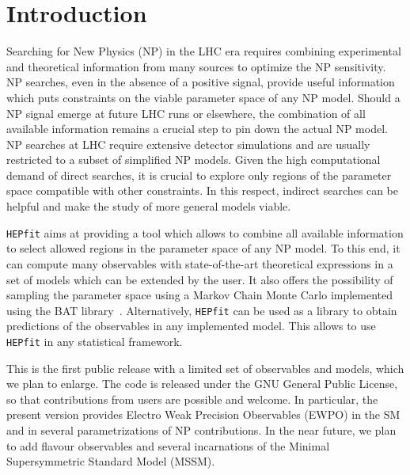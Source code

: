 \documentclass[aps,superscriptaddress,nofootinbib,floatfix,notitlepage]{revtex4-1}
\newcommand{\HEPfit}{\texttt{HEPfit}\xspace}
\begin{document}
\maketitle



\section{Introduction}

Searching for New Physics (NP) in the LHC era requires combining
experimental and theoretical information from many sources to optimize
the NP sensitivity. NP searches, even in the absence of a positive
signal, provide useful information which puts constraints on the
viable parameter space of any NP model. Should a NP signal emerge at
future LHC runs or elsewhere, the combination of all available
information remains a crucial step to pin down the actual NP model.
NP searches at LHC require extensive detector simulations and are
usually restricted to a subset of simplified NP models. Given the high
computational demand of direct searches, it is crucial to explore only
regions of the parameter space compatible with other constraints. In
this respect, indirect searches can be helpful and make the study of
more general models viable.

\HEPfit aims at providing a tool which allows to combine all
available information to select allowed regions in the parameter space
of any NP model. To this end, it can compute many observables with
state-of-the-art theoretical expressions in a set of models which can
be extended by the user. It also offers the possibility of sampling
the parameter space using a Markov Chain Monte Carlo implemented using
the BAT library~\cite{arXiv:0808.2552}. Alternatively, \HEPfit can be
used as a library to obtain predictions of the observables in any
implemented model. This allows to use \HEPfit in any statistical
framework.

This is the first public release with a limited set of observables and
models, which we plan to enlarge. The code is released under the GNU
General Public License, so that contributions from users are possible
and welcome. In particular, the present version provides Electro Weak
Precision Observables (EWPO) in the SM and in several parametrizations
of NP contributions. In the near future, we plan to add flavour
observables and several incarnations of the Minimal Supersymmetric
Standard Model (MSSM).
\end{document}
